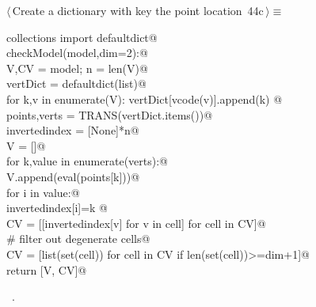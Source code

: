 \documentclass[11pt,oneside]{article}	%
\begin{document}
\begin{flushleft} \small \label{scrap73}
\protect{}$\langle\,$Create a dictionary with key the point location\nobreak\ {\footnotesize 44c}$\,\rangle\equiv$
\vspace{-1ex}
\begin{list}{}{} \item
\mbox{}\verb@from collections import defaultdict@\\
\mbox{}\verb@def checkModel(model,dim=2):@\\
\mbox{}\verb@   V,CV = model; n = len(V)@\\
\mbox{}\verb@   vertDict = defaultdict(list)@\\
\mbox{}\verb@   for k,v in enumerate(V): vertDict[vcode(v)].append(k) @\\
\mbox{}\verb@   points,verts = TRANS(vertDict.items())@\\
\mbox{}\verb@   invertedindex = [None]*n@\\
\mbox{}\verb@   V = []@\\
\mbox{}\verb@   for k,value in enumerate(verts):@\\
\mbox{}\verb@      V.append(eval(points[k]))@\\
\mbox{}\verb@      for i in value:@\\
\mbox{}\verb@         invertedindex[i]=k   @\\
\mbox{}\verb@   CV = [[invertedindex[v] for v in cell] for cell in CV]@\\
\mbox{}\verb@   # filter out degenerate cells@\\
\mbox{}\verb@   CV = [list(set(cell)) for cell in CV if len(set(cell))>=dim+1]@\\
\mbox{}\verb@   return [V, CV]@\\
\mbox{}\verb@@{\NWsep}
\end{list}
\vspace{-1ex}
\footnotesize\addtolength{\baselineskip}{-1ex}
\begin{list}{}{\setlength{\itemsep}{-\parsep}\setlength{\itemindent}{-\leftmargin}}
\item \NWtxtMacroRefIn\ .
\end{list}
\end{flushleft}
\end{document}
